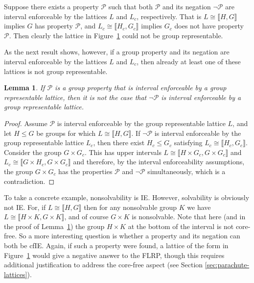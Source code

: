 \documentclass{gen-j-l}
\newcommand{\lb}{\ensuremath{\llbracket}}
\newcommand{\rb}{\ensuremath{\rrbracket}}
\newcommand{\<}{\ensuremath{\langle}}
\renewcommand{\>}{\ensuremath{\rangle}}
\theoremstyle{plain}
\newtheorem{lemma}[theorem]{Lemma}
\theoremstyle{definition}
\theoremstyle{remark}
\numberwithin{theorem}{section}
\numberwithin{claim}{section}
\numberwithin{equation}{section}
\numberwithin{conjecture}{section}
\renewcommand{\leq}{\ensuremath{\leqslant}}
\newcommand{\2}{\ensuremath{\mathbf{2}}}
\newcommand{\3}{\ensuremath{\mathbf{3}}}
\newcommand{\cP}{\ensuremath{\mathcal{P}}}
\newcommand{\IE}{{\small IE}}
\begin{document}
Suppose there exists a property $\cP$ such that both $\cP$ and
its negation $\neg \cP$ are interval enforceable by the lattices $L$ and $L_c$,
respectively.  That is $L\cong \lb H,G \rb$ implies $G$ has property $\cP$, and 
$L_c\cong \lb H_c,G_c \rb$ implies $G_c$ does not have property $\cP$.  
Then clearly the lattice in Figure~\ref{fig:twopanelchute} could not be group
representable.   
\begin{figure}[!h]
  \centering
{}
\caption{}
\label{fig:twopanelchute}  
\end{figure}
As the next result shows, however, if a group property and its
negation are interval enforceable by the lattices $L$ and $L_c$, then already
at least one of these lattices is not group representable.
\begin{lemma}
\label{lemma:ie-prop-and-neg}
  If $\cP$ is a group property that is interval enforceable by a group
  representable lattice, then it is not the case that $\neg \cP$ is interval
  enforceable by a group representable lattice. 
\end{lemma}
\begin{proof}
Assume $\cP$ is 
interval enforceable by the group representable lattice $L$, and let
$H\leq G$ be groups for which $L\cong \lb H, G\rb$.
If $\neg \cP$ is interval enforceable by the group representable
lattice $L_c$, then there exist $H_c\leq G_c$ satisfying
$L_c\cong \lb H_c, G_c\rb$. Consider the group $G\times G_c$. This
has upper intervals $L\cong \lb H\times G_c, G\times G_c \rb$ and 
$L_c\cong \lb G\times H_c, G\times G_c \rb$ and therefore, by the interval
enforceability assumptions,  the group $G\times G_c$ has the properties
$\cP$ and $\neg \cP$ simultaneously, which is a contradiction.
\end{proof}
To take a concrete example, nonsolvability is \IE.  However, solvability is
obviously not \IE. For, if $L\cong \lb H, G \rb$ then for any nonsolvable 
group $K$ we have $L\cong \lb H\times K, G\times K \rb$, and of course $G\times K$ is
nonsolvable.  Note that here (and in the proof 
of Lemma~\ref{lemma:ie-prop-and-neg}) the group $H\times K$ at the bottom of
the interval is not core-free.  So a more interesting question is whether a
property and its negation can both be \acs{cfIE}.  Again, if such a property were
found, a lattice of the form in Figure~\ref{fig:twopanelchute} would give a
negative answer to the \acs{FLRP}, though this requires additional justification to address
the core-free aspect (see Section \ref{sec:parachute-lattices}).  
\end{document}
